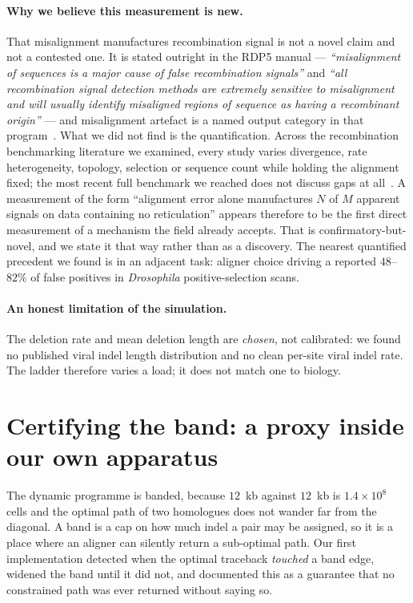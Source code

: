 \documentclass[11pt,a4paper]{article}
\theoremstyle{definition}
\theoremstyle{remark}
\begin{document}
\paragraph{Why we believe this measurement is new.} That misalignment
manufactures recombination signal is not a novel claim and not a contested one.
It is stated outright in the RDP5 manual --- \emph{``misalignment of sequences is
a major cause of false recombination signals''} and \emph{``all recombination
signal detection methods are extremely sensitive to misalignment and will
usually identify misaligned regions of sequence as having a recombinant
origin''} --- and misalignment artefact is a named output category in that
program~\cite{rdp5}. What we did not find is the quantification. Across the
recombination benchmarking literature we examined, every study varies divergence,
rate heterogeneity, topology, selection or sequence count while holding the
alignment fixed; the most recent full benchmark we reached does not discuss gaps
at all~\cite{jaya}. A measurement of the form ``alignment error alone
manufactures $N$ of $M$ apparent signals on data containing no reticulation''
appears therefore to be the first direct measurement of a mechanism the field
already accepts. That is confirmatory-but-novel, and we state it that way rather
than as a discovery. The nearest quantified precedent we found is in an adjacent
task: aligner choice driving a reported $48$--$82\%$ of false positives in
\emph{Drosophila} positive-selection scans.

\paragraph{An honest limitation of the simulation.} The deletion rate and mean
deletion length are \emph{chosen}, not calibrated: we found no published viral
indel length distribution and no clean per-site viral indel rate. The ladder
therefore varies a load; it does not match one to biology.

\section{Certifying the band: a proxy inside our own apparatus}\label{sec:band}

The dynamic programme is banded, because $12$~kb against $12$~kb is
$1.4 \times 10^8$ cells and the optimal path of two homologues does not wander
far from the diagonal. A band is a cap on how much indel a pair may be assigned,
so it is a place where an aligner can silently return a sub-optimal path. Our
first implementation detected when the optimal traceback \emph{touched} a band
edge, widened the band until it did not, and documented this as a guarantee that
no constrained path was ever returned without saying so.
\end{document}

